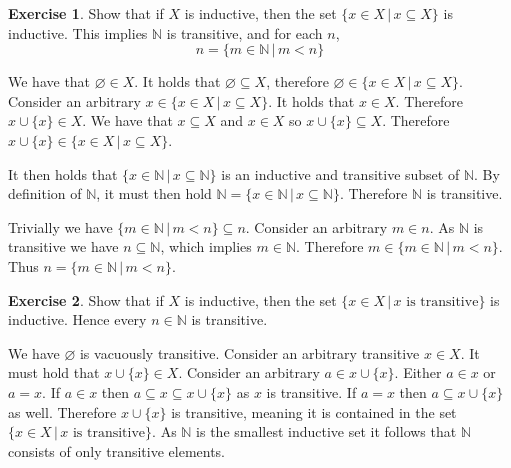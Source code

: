 \documentclass{article}
\theoremstyle{definition}
\newtheorem{exer}{Exercise}[section]
\newcommand{\N}{\mathbb{N}}
\newcommand*{\mtset}{\ensuremath{\varnothing}}
\newlength{\defparindent}
\newenvironment{answer}
    {\begin{mdframed}[backgroundcolor=gray!15, linewidth=0pt] \setlength{\parindent}{\defparindent}}
    {\end{mdframed}}
\begin{document}
\begin{exer}
    Show that if $X$ is inductive, then the set $\{x \in X \, | \, x \subseteq X\}$ is inductive. This implies $\N$ is transitive, and for each $n$, 
    \[
        n = \{m \in \N \, | \, m < n \}
    \]

    \begin{answer}
        We have that $\mtset \in X$. It holds that $\mtset \subseteq X$, therefore $\mtset \in \{x \in X \, | \, x \subseteq X\}$. Consider an arbitrary $x \in \{x \in X \, | \, x \subseteq X\}$. It holds that $x \in X$. Therefore $x \cup \{x\} \in X$. We have that $x \subseteq X$ and $x \in X$ so $x \cup \{x\} \subseteq X$. Therefore $x \cup \{x\} \in \{x \in X \, | \, x \subseteq X\}$. 
        
        It then holds that $\{x \in \N \, | \, x \subseteq \N\}$ is an inductive and transitive subset of $\N$. By definition of $\N$, it must then hold $\N = \{x \in \N \, | \, x \subseteq \N\}$. Therefore $\N$ is transitive. 
        
        Trivially we have $\{m \in \N \, | \, m < n\} \subseteq n$. Consider an arbitrary $m \in n$. As $\N$ is transitive we have $n \subseteq \N$, which implies $m \in \N$. Therefore $m \in \{m \in \N \, | \, m < n\}$. Thus $n = \{m \in \N \, | \, m < n\}$. 
    \end{answer}
\end{exer}

\begin{exer}
    Show that if $X$ is inductive, then the set $\{x \in X \, | \, x \text{ is transitive} \}$ is inductive. Hence every $n \in \N $ is transitive.
    \begin{answer}
        We have $\mtset$ is vacuously transitive. Consider an arbitrary transitive $x \in X$. It must hold that $x \cup \{x\} \in X$. Consider an arbitrary $a \in x \cup \{x\}$. Either $a \in x$ or $a = x$. If $a \in x$ then $a \subseteq x \subseteq x \cup \{x\}$ as $x$ is transitive. If $a = x$ then $a \subseteq x \cup \{x\}$ as well. Therefore $x  \cup \{x\}$ is transitive, meaning it is contained in the set $\{x \in X \, | \, x \text{ is transitive} \}$. As $\N$ is the smallest inductive set it follows that $\N$ consists of only transitive elements.
    \end{answer}
\end{exer}
\end{document}
